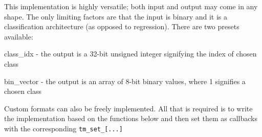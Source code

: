 \documentclass[english]{aghengthesis} %
\begin{document}
This implementation is highly versatile; both input and output may come in any shape. The only limiting factors are that the input is binary and it is a classification architecture (as opposed to regression). There are two presets available:
\begin{compactenum}
    \item class\_idx - the output is a 32-bit unsigned integer signifying the index of chosen class
    \item bin\_vector - the output is an array of 8-bit binary values, where 1 signifies a chosen class
\end{compactenum}
Custom formats can also be freely implemented. All that is required is to write the implementation based on the functions below and then set them as callbacks with the corresponding \texttt{tm\_set\_[...]}






\end{document}
